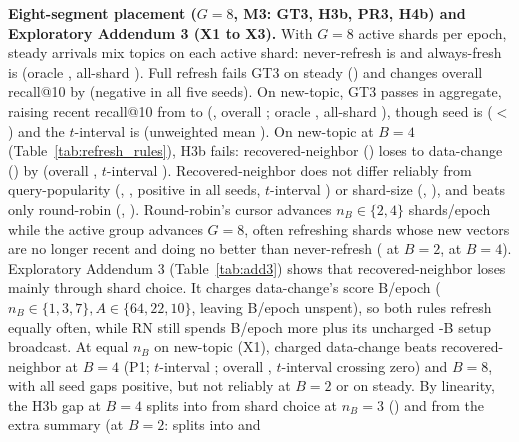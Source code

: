 \textbf{Eight-segment placement ($G = 8$, M3: GT3, H3b, PR3, H4b) and Exploratory Addendum 3 (X1 to X3).} With $G = 8$ active shards per epoch, steady arrivals mix topics on each active shard: never-refresh is \RNumMThreeNRRecentSteady{} and always-fresh is \RNumMThreeAFRecentSteady{} (oracle \RNumMThreeOracleRecentSteady{}, all-shard \RNumMThreeAllShardsRecentSteady{}). Full refresh fails GT3 on steady (\RNumGateMThreeSteady{}) and changes overall recall@10 by \RNumGateMThreeOverallSteady{} (negative in all five seeds). On new-topic, GT3 passes in aggregate, raising recent recall@10 from \RNumMThreeNRRecentNewTopic{} to \RNumMThreeAFRecentNewTopic{} (\RNumGateMThreeNewTopic{}, overall \RNumGateMThreeOverallNewTopic{}; oracle \RNumMThreeOracleRecentNewTopic{}, all-shard \RNumMThreeAllShardsRecentNewTopic{}), though seed \RNumGateMThreeNewTopicMinSeed{} is \RNumGateMThreeNewTopicMinSeedGap{} ($< {}$\RNumGateThresholdPP{}) and the $t$-interval is \RNumGateMThreeNewTopicTInt{} (unweighted mean \RNumGateMThreeNewTopicUnweightedMean{}). On new-topic at $B = 4$ (Table~\ref{tab:refresh_rules}), H3b fails: recovered-neighbor (\RNumMThreeRNRecentBFourNewTopic{}) loses to data-change (\RNumMThreeDCRecentBFourNewTopic{}) by \RNumHThreeBRNMinusDCNewTopic{} (overall \RNumHThreeBRNMinusDCOverallNewTopic{}, $t$-interval \RNumHThreeBRNMinusDCOverallNewTopicTInt{}). Recovered-neighbor does not differ reliably from query-popularity (\RNumMThreeQLRecentBFourNewTopic{}, \RNumHThreeBRNMinusQLNewTopic{}, positive in all \RNumFiveSeeds{} seeds, $t$-interval \RNumHThreeBMThreeRNMinusQLNewTopicTInt{}) or shard-size (\RNumMThreeSSRecentBFourNewTopic{}, \RNumHThreeBRNMinusSSNewTopic{}), and beats only round-robin (\RNumMThreeRRRecentBFourNewTopic{}, \RNumHThreeBRNMinusRRNewTopic{}). Round-robin's cursor advances $n_B \in \{2, 4\}$ shards/epoch while the active group advances $G{=}8$, often refreshing shards whose new vectors are no longer recent and doing no better than never-refresh (\RNumMThreeRRMinusNRBTwoNewTopic{} at $B{=}2$, \RNumMThreeRRMinusNRBFourNewTopic{} at $B{=}4$). Exploratory Addendum 3 (Table~\ref{tab:add3}) shows that recovered-neighbor loses mainly through shard choice. It charges data-change's \RNumDCScoreEpochBytes{} score B/epoch ($n_B \in \{1, 3, 7\}, A \in \{64, 22, 10\}$, leaving \RNumAddThreeDCUnspentEpochBytes{} B/epoch unspent), so both rules refresh equally often, while RN still spends \RNumAddThreeRNExtraEpochBytesVsChargedDC{} B/epoch more plus its uncharged \RNumRNSetupBroadcastBytes{}-B setup broadcast. At equal $n_B$ on new-topic (X1), charged data-change beats recovered-neighbor at $B = 4$ (P1; $t$-interval \RNumAddThreeXOneRNBFourNewTopicTInt{}; overall \RNumAddThreeXOneRNOverallBFourNewTopic{}, $t$-interval crossing zero) and $B = 8$, with all \RNumAddThreeXOnePosSeedsBFourBEight{} seed gaps positive, but not reliably at $B = 2$ or on steady. By linearity, the \RNumHThreeBRNMinusDCNewTopicAbsMean{} H3b gap at $B{=}4$ splits into \RNumAddThreeXOneRNBFourNewTopicAbsMean{} from shard choice at $n_B{=}3$ (\RNumAddThreeXOneChoiceShareBFour{}) and \RNumAddThreeXThreeDCBFourNewTopicAbsMean{} from the extra summary (at $B{=}2$: \RNumAddThreeRNMinusUnchargedDCBTwoNewTopicAbsMean{} splits into \RNumAddThreeXOneRNBTwoNewTopicAbsMean{} and 